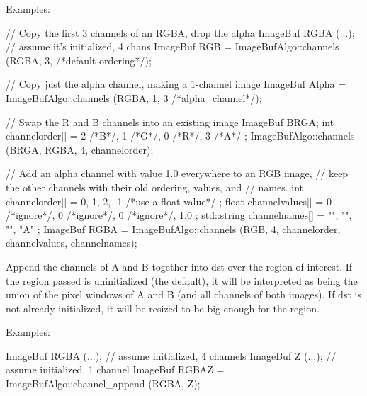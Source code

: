 \smallskip
\noindent Examples:
\begin{code}
    // Copy the first 3 channels of an RGBA, drop the alpha
    ImageBuf RGBA (...);   // assume it's initialized, 4 chans
    ImageBuf RGB = ImageBufAlgo::channels (RGBA, 3, {} /*default ordering*/);

    // Copy just the alpha channel, making a 1-channel image
    ImageBuf Alpha = ImageBufAlgo::channels (RGBA, 1, 3 /*alpha_channel*/);

    // Swap the R and B channels into an existing image
    ImageBuf BRGA;
    int channelorder[] = { 2 /*B*/, 1 /*G*/, 0 /*R*/, 3 /*A*/ };
    ImageBufAlgo::channels (BRGA, RGBA, 4, channelorder);

    // Add an alpha channel with value 1.0 everywhere to an RGB image,
    // keep the other channels with their old ordering, values, and
    // names.
    int channelorder[] = { 0, 1, 2, -1 /*use a float value*/ };
    float channelvalues[] = { 0 /*ignore*/, 0 /*ignore*/, 0 /*ignore*/, 1.0 };
    std::string channelnames[] = { "", "", "", "A" };
    ImageBuf RGBA = ImageBufAlgo::channels (RGB, 4, channelorder,
                                            channelvalues, channelnames);
\end{code}
\apiend

 

Append the channels of {\cf A} and {\cf B} together into {\cf dst} over
the region of interest.  If the region passed is uninitialized (the
default), it will be interpreted as being the union of the pixel windows
of {\cf A} and {\cf B} (and all channels of both images).  If {\cf dst}
is not already initialized, it will be resized to be big enough for the
region.

\smallskip
\noindent Examples:
\begin{code}
    ImageBuf RGBA (...);   // assume initialized, 4 channels
    ImageBuf Z (...);      // assume initialized, 1 channel
    ImageBuf RGBAZ = ImageBufAlgo::channel_append (RGBA, Z);
\end{code}
\apiend


